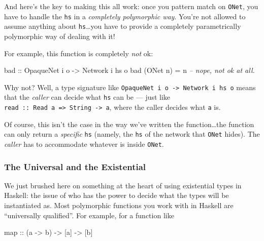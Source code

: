 \documentclass[]{article}
\newenvironment{Shaded}{}{}
\newcommand{\CommentTok}[1]{\textcolor[rgb]{0.38,0.63,0.69}{\textit{#1}}}
\newcommand{\DataTypeTok}[1]{\textcolor[rgb]{0.56,0.13,0.00}{#1}}
\newcommand{\FunctionTok}[1]{\textcolor[rgb]{0.02,0.16,0.49}{#1}}
\newcommand{\NormalTok}[1]{#1}
\newcommand{\OtherTok}[1]{\textcolor[rgb]{0.00,0.44,0.13}{#1}}
\begin{document}
And here's the key to making this all work: once you pattern match on
\texttt{ONet}, you have to handle the \texttt{hs} in a \emph{completely
polymorphic way}. You're not allowed to assume anything about
\texttt{hs}\ldots{}you have to provide a completely parametrically polymorphic
way of dealing with it!

For example, this function is completely \emph{not} ok:

\begin{Shaded}
\begin{Highlighting}[]
\OtherTok{bad ::} \DataTypeTok{OpaqueNet}\NormalTok{ i o }\OtherTok{->} \DataTypeTok{Network}\NormalTok{ i hs o}
\NormalTok{bad (}\DataTypeTok{ONet}\NormalTok{ n) }\FunctionTok{=}\NormalTok{ n            }\CommentTok{-- nope, not ok at all.}
\end{Highlighting}
\end{Shaded}

Why not? Well, a type signature like
\texttt{OpaqueNet\ i\ o\ -\textgreater{}\ Network\ i\ hs\ o} means that the
\emph{caller} can decide what \texttt{hs} can be --- just like
\texttt{read\ ::\ Read\ a\ =\textgreater{}\ String\ -\textgreater{}\ a}, where
the caller decides what \texttt{a} is.

Of course, this isn't the case in the way we've written the function\ldots{}the
function can only return a \emph{specific} \texttt{hs} (namely, the \texttt{hs}
of the network that \texttt{ONet} hides). The \emph{caller} has to accommodate
whatever is inside \texttt{ONet}.

\hypertarget{the-universal-and-the-existential}{%
\subsubsection{The Universal and the
Existential}\label{the-universal-and-the-existential}}

We just brushed here on something at the heart of using existential types in
Haskell: the issue of who has the power to decide what the types will be
instantiated as. Most polymorphic functions you work with in Haskell are
``universally qualified''. For example, for a function like

\begin{Shaded}
\begin{Highlighting}[]
\NormalTok{map}\OtherTok{ ::}\NormalTok{ (a }\OtherTok{->}\NormalTok{ b) }\OtherTok{->}\NormalTok{ [a] }\OtherTok{->}\NormalTok{ [b]}
\end{Highlighting}
\end{Shaded}
\end{document}
